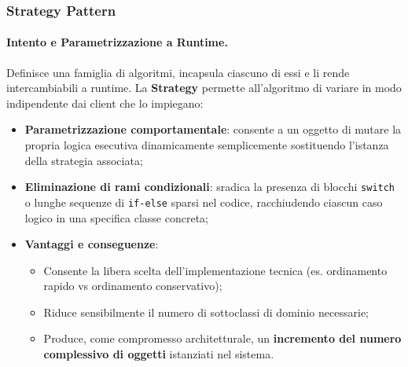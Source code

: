 \documentclass[12pt]{extarticle}
\begin{document}
\subsubsection{Strategy Pattern}

\paragraph{Intento e Parametrizzazione a Runtime.}
Definisce una famiglia di algoritmi, incapsula ciascuno di essi e li rende intercambiabili a runtime. La \textbf{Strategy} permette all'algoritmo di variare in modo indipendente dai client che lo impiegano:
\begin{itemize}
    \item \textbf{Parametrizzazione comportamentale}: consente a un oggetto di mutare la propria logica esecutiva dinamicamente semplicemente sostituendo l'istanza della strategia associata;
    \item \textbf{Eliminazione di rami condizionali}: sradica la presenza di blocchi \texttt{switch} o lunghe sequenze di \texttt{if-else} sparsi nel codice, racchiudendo ciascun caso logico in una specifica classe concreta;
    \item \textbf{Vantaggi e conseguenze}:
    \begin{itemize}
        \item Consente la libera scelta dell'implementazione tecnica (es. ordinamento rapido vs ordinamento conservativo);
        \item Riduce sensibilmente il numero di sottoclassi di dominio necessarie;
        \item Produce, come compromesso architetturale, un \textbf{incremento del numero complessivo di oggetti} istanziati nel sistema.
    \end{itemize}
\end{itemize}
\end{document}
